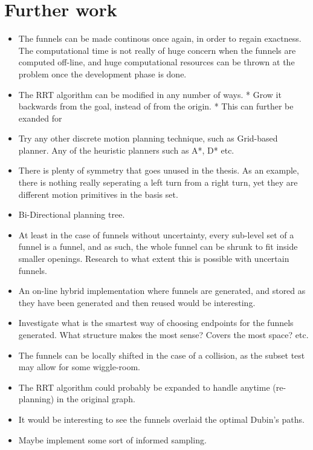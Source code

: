 \chapter{Further work}

\begin{itemize}
  \item The funnels can be made continous once again, in order to regain
    exactness. The computational time is not really of huge concern when the
    funnels are computed off-line, and huge computational resources can be
    thrown at the problem once the development phase is done.
  \item The RRT algorithm can be modified in any number of ways.
    * Grow it backwards from the goal, instead of from the origin.
    * This can further be exanded for 

  \item Try any other discrete motion planning technique, such as Grid-based
    planner. Any of the heuristic planners such as A*, D* etc.

  \item There is plenty of symmetry that goes unused in the thesis. As an
    example, there is nothing really seperating a left turn from a right turn,
    yet they are different motion primitives in the basis set.

  \item Bi-Directional planning tree.

  \item At least in the case of funnels without uncertainty, every sub-level set
    of a funnel is a funnel, and as such, the whole funnel can be shrunk to fit
    inside smaller openings. Research to what extent this is possible with
    uncertain funnels.

  \item An on-line hybrid implementation where funnels are generated, and stored
    as they have been generated and then reused would be interesting.

  \item  Investigate what is the smartest way of choosing endpoints for the
    funnels generated. What structure makes the most sense? Covers the most
    space? etc.

  \item The funnels can be locally shifted in the case of a collision, as the
    subset test may allow for some wiggle-room.

  \item The RRT algorithm could probably be expanded to handle anytime
    (re-planning) in the original graph.

  \item It would be interesting to see the funnels overlaid the optimal Dubin's paths.

  \item Maybe implement some sort of informed sampling.

\end{itemize}